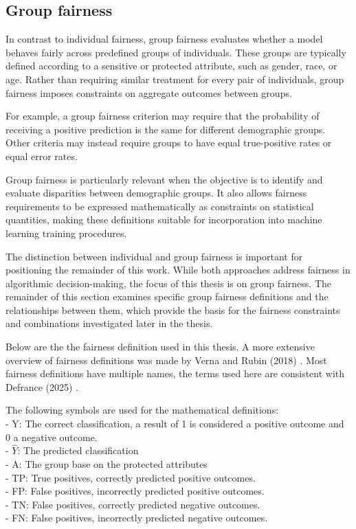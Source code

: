 \subsection{Group fairness}
\label{sec:groupfair}
In contrast to individual fairness, group fairness evaluates whether a model behaves fairly across predefined groups of individuals. These groups are typically defined according to a sensitive or protected attribute, such as gender, race, or age. Rather than requiring similar treatment for every pair of individuals, group fairness imposes constraints on aggregate outcomes between groups.

For example, a group fairness criterion may require that the probability of receiving a positive prediction is the same for different demographic groups. Other criteria may instead require groups to have equal true-positive rates or equal error rates.

Group fairness is particularly relevant when the objective is to identify and evaluate disparities between demographic groups. It also allows fairness requirements to be expressed mathematically as constraints on statistical quantities, making these definitions suitable for incorporation into machine learning training procedures.

The distinction between individual and group fairness is important for positioning the remainder of this work. While both approaches address fairness in algorithmic decision-making, the focus of this thesis is on group fairness. The remainder of this section examines specific group fairness definitions and the relationships between them, which provide the basis for the fairness constraints and combinations investigated later in the thesis.

Below are the the fairness definition used in this thesis. A more extensive overview of fairness definitions was made by Verna and Rubin (2018) \cite{fair_definitions}. Most fairness definitions have multiple names, the terms used here are consistent with Defrance (2025) \cite{max_combinations}.

The following symbols are used for the mathematical definitions:
\\- Y: The correct classification, a result of 1 is considered a positive outcome and 0 a negative outcome.
\\- $\hat{Y}$: The predicted classification
\\- A: The group base on the protected attributes
\\- TP: True positives, correctly predicted positive outcomes.
\\- FP: False positives, incorrectly predicted positive outcomes.
\\- TN: False positives, correctly predicted negative outcomes.
\\- FN: False positives, incorrectly predicted negative outcomes.
\\

